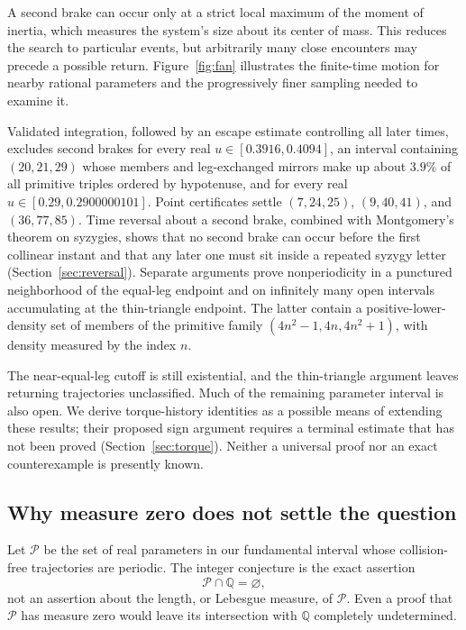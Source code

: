 A second brake can occur only at a strict local maximum of the moment of
inertia, which measures the system's size about its center of mass. This
reduces the search to particular events, but arbitrarily many close
encounters may precede a possible return. Figure~\ref{fig:fan} illustrates
the finite-time motion for nearby rational parameters and the progressively
finer sampling needed to examine it.

Validated integration, followed by an escape estimate controlling all
later times, excludes second brakes for every real
$u\in[0.3916,0.4094]$, an interval containing $(20,21,29)$ whose members
and leg-exchanged mirrors make up about $3.9\%$ of all primitive triples
ordered by hypotenuse, and for every real $u\in[0.29,0.2900000101]$.
Point certificates settle $(7,24,25)$, $(9,40,41)$, and $(36,77,85)$.
Time reversal about a second brake, combined with Montgomery's theorem on
syzygies, shows that no second brake can occur before the first collinear
instant and that any later one must sit inside a repeated syzygy letter
(Section~\ref{sec:reversal}). Separate arguments prove nonperiodicity in a
punctured neighborhood of the equal-leg endpoint and on infinitely many
open intervals accumulating at the thin-triangle endpoint. The latter
contain a positive-lower-density set of members of the primitive family
$(4n^2-1,4n,4n^2+1)$, with density measured by the index $n$.

The near-equal-leg cutoff is still existential, and the thin-triangle
argument leaves returning trajectories unclassified. Much of the remaining
parameter interval is also open. We derive torque-history identities as a
possible means of extending these results; their proposed sign argument
requires a terminal estimate that has not been proved
(Section~\ref{sec:torque}). Neither a universal proof nor an exact
counterexample is presently known.

\subsection{Why measure zero does not settle the question}

Let $\mathcal P$ be the set of real parameters in our fundamental interval
whose collision-free trajectories are periodic. The integer conjecture is
the exact assertion
\[
 \mathcal P\cap\mathbb Q=\varnothing,
\]
not an assertion about the length, or Lebesgue measure, of $\mathcal P$.
Even a proof that $\mathcal P$ has measure zero would leave its intersection
with $\mathbb Q$ completely undetermined.

